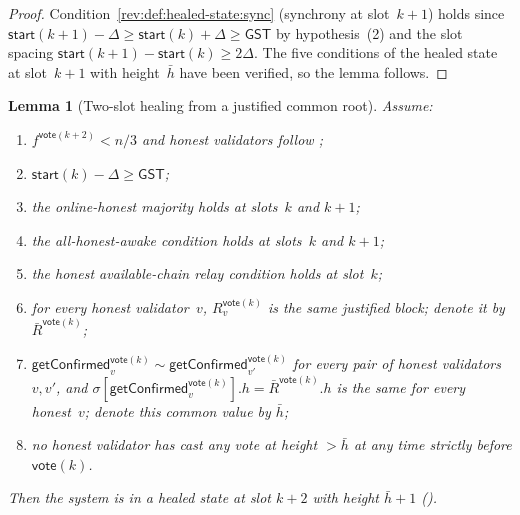 \ifx\litemode\undefined\documentclass{article}\fi
\newcommand{\start}{\mathsf{start}}
\newcommand{\vote}{\mathsf{vote}}
\newcommand{\comm}[1]{\bar{#1}}
\newcommand{\getConfirmed}{\textsf{getConfirmed}\xspace}
\theoremstyle{plain}
\newtheorem{lemma}{Lemma}
\theoremstyle{definition}
\theoremstyle{remark}
\newcommand{\GST}{\ensuremath{\mathsf{GST}}}
\newcommand{\OHM}{online-honest majority\xspace}
\newcommand{\HAR}{honest available-chain relay\xspace}
\newcommand{\AHA}{all-honest-awake\xspace}
\begin{document}
\begin{proof}
Condition~\ref{rev:def:healed-state:sync} (synchrony at slot~$k+1$) holds since $\start(k+1) - \Delta \geq \start(k) + \Delta \geq \GST$ by hypothesis~(2) and the slot spacing $\start(k+1) - \start(k) \geq 2\Delta$. The five conditions of the healed state at slot~$k+1$ with height~$\comm{h}$ have been verified, so the lemma follows.
\end{proof}


\begin{lemma}[Two-slot healing from a justified common root]\label{rev:lem:healing-from-justified}
Assume:
\begin{enumerate}
  \item $f^{\vote(k+2)} < n/3$ and honest validators follow ;
  \item $\start(k) - \Delta \geq \GST$;
  \item the \OHM holds at slots~$k$ and $k+1$;
  \item the \AHA condition holds at slots~$k$ and $k+1$;
  \item the \HAR condition holds at slot~$k$;
  \item for every honest validator~$v$, $R_v^{\vote(k)}$ is the same justified block; denote it by $\comm{R}^{\vote(k)}$;
  \item $\getConfirmed_v^{\vote(k)} \sim \getConfirmed_{v'}^{\vote(k)}$ for every pair of honest validators~$v, v'$, and $\sigma[\getConfirmed_v^{\vote(k)}].h = \comm{R}^{\vote(k)}.h$ is the same for every honest~$v$; denote this common value by $\comm{h}$;
  \item no honest validator has cast any vote at height $> \comm{h}$ at any time strictly before $\vote(k)$.
\end{enumerate}
Then the system is in a healed state at slot $k+2$ with height $\comm{h}+1$ ().
\end{lemma}
\end{document}
